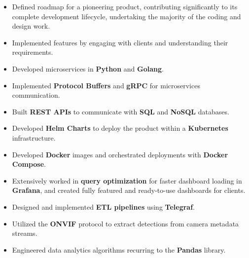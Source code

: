 \documentclass[10pt,a4paper,ragged2e,withhyper]{altacv}
\begin{document}
\begin{paracol}{2}



      \begin{itemize}
            \item Defined roadmap for a pioneering product, contributing significantly to its
                  complete development lifecycle, undertaking the majority of the coding and
                  design work.
            \item Implemented features by engaging with clients and understanding their
                  requirements.
            \item Developed microservices in \textbf{Python} and \textbf{Golang}.
            \item Implemented \textbf{Protocol Buffers} and \textbf{gRPC} for microservices
                  communication.
            \item Built \textbf{REST APIs} to communicate with \textbf{SQL} and \textbf{NoSQL}
                  databases.
            \item Developed \textbf{Helm Charts} to deploy the product within a
                  \textbf{Kubernetes} infrastructure.
            \item Developed \textbf{Docker} images and orchestrated deployments with
                  \textbf{Docker Compose}.
            \item Extensively worked in \textbf{query optimization} for faster dashboard loading
                  in \textbf{Grafana}, and created fully featured and ready-to-use dashboards for
                  clients.
            \item Designed and implemented \textbf{ETL pipelines} using \textbf{Telegraf}.
            \item Utilized the \textbf{ONVIF} protocol to extract detections from camera metadata
                  streams.
            \item Engineered data analytics algorithms recurring to the \textbf{Pandas} library.
          
      \end{itemize}
      \bigskip



\end{paracol}
\end{document}
